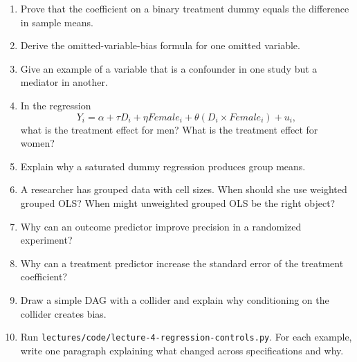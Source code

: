 \begin{enumerate}
\item Prove that the coefficient on a binary treatment dummy equals the
difference in sample means.
\item Derive the omitted-variable-bias formula for one omitted variable.
\item Give an example of a variable that is a confounder in one study but a
mediator in another.
\item In the regression
\[
  Y_i=\alpha+\tau D_i+\eta Female_i+\theta(D_i\times Female_i)+u_i,
\]
what is the treatment effect for men? What is the treatment effect for women?
\item Explain why a saturated dummy regression produces group means.
\item A researcher has grouped data with cell sizes. When should she use
weighted grouped OLS? When might unweighted grouped OLS be the right object?
\item Why can an outcome predictor improve precision in a randomized
experiment?
\item Why can a treatment predictor increase the standard error of the
treatment coefficient?
\item Draw a simple DAG with a collider and explain why conditioning on the
collider creates bias.
\item Run \texttt{lectures/code/lecture-4-regression-controls.py}. For each
example, write one paragraph explaining what changed across specifications and
why.
\end{enumerate}


